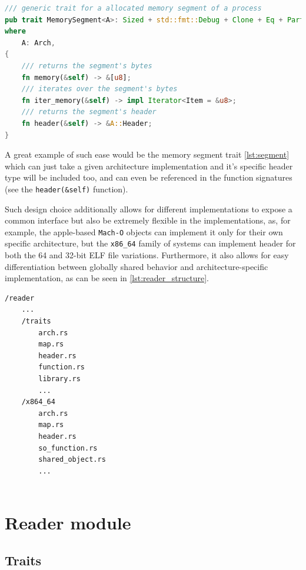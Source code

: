 \begin{lstlisting}[caption=\label{lst:segment}"The memory segment trait", language=Rust]
/// generic trait for a allocated memory segment of a process
pub trait MemorySegment<A>: Sized + std::fmt::Debug + Clone + Eq + PartialEq
where
    A: Arch,
{
    /// returns the segment's bytes
    fn memory(&self) -> &[u8];
    /// iterates over the segment's bytes
    fn iter_memory(&self) -> impl Iterator<Item = &u8>;
    /// returns the segment's header
    fn header(&self) -> &A::Header;
}
\end{lstlisting}

A great example of such ease would be the memory segment trait \autoref{lst:segment} which can just take a given architecture implementation and it's specific header type will be included too, and can even be referenced in the function signatures (see the \verb|header(&self)| function).

Such design choice additionally allows for different implementations to expose a common interface but also be extremely flexible in the implementations, as, for example, the apple-based \verb|Mach-O| objects can implement it only for their own specific architecture, but the \verb|x86_64| family of systems can implement header for both the 64 and 32-bit ELF file variations. Furthermore, it also allows for easy differentiation between globally shared behavior and architecture-specific implementation, as can be seen in \autoref{lst:reader_structure}.

\begin{lstlisting}[caption=\label{lst:reader_structure}"Structure of the reader module outlining separate trait and implementation folder"]
/reader
    ...
    /traits
        arch.rs
        map.rs
        header.rs
        function.rs
        library.rs
        ...
    /x864_64
        arch.rs
        map.rs
        header.rs
        so_function.rs
        shared_object.rs
        ...
        
\end{lstlisting}

\section{Reader module}
\label{reader}

\subsection{Traits}

